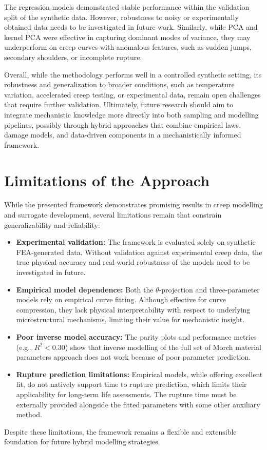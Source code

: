 \documentclass[class=scrbook, crop=false]{standalone}
\begin{document}
The regression models demonstrated stable performance within the validation split of the synthetic data. However, robustness to noisy or experimentally obtained data needs to be investigated in future work. Similarly, while PCA and kernel PCA were effective in capturing dominant modes of variance, they may underperform on creep curves with anomalous features, such as sudden jumps, secondary shoulders, or incomplete rupture.

Overall, while the methodology performs well in a controlled synthetic setting, its robustness and generalization to broader conditions, such as temperature variation, accelerated creep testing, or experimental data, remain open challenges that require further validation. Ultimately, future research should aim to integrate mechanistic knowledge more directly into both sampling and modelling pipelines, possibly through hybrid approaches that combine empirical laws, damage models, and data-driven components in a mechanistically informed framework.

\section{Limitations of the Approach}
\label{Section::Discussion_Limitations}

While the presented framework demonstrates promising results in creep modelling and surrogate development, several limitations remain that constrain generalizability and reliability:

\begin{itemize}
	\item \textbf{Experimental validation:} The framework is evaluated solely on synthetic FEA-generated data. Without validation against experimental creep data, the true physical accuracy and real-world robustness of the models need to be investigated in future.
	
	\item \textbf{Empirical model dependence:} Both the $\theta$-projection and three-parameter models rely on empirical curve fitting. Although effective for curve compression, they lack physical interpretability with respect to underlying microstructural mechanisms, limiting their value for mechanistic insight.
		
	\item \textbf{Poor inverse model accuracy:} The parity plots and performance metrics (e.g., $R^2 < 0.30$) show that inverse modelling of the full set of Morch material parameters approach does not work because of poor parameter prediction.
	
	\item \textbf{Rupture prediction limitations:} Empirical models, while offering excellent fit, do not natively support time to rupture prediction, which limits their applicability for long-term life assessments. The rupture time must be externally provided alongside the fitted parameters with some other auxiliary method.
	
\end{itemize}
Despite these limitations, the framework remains a flexible and extensible foundation for future hybrid modelling strategies.
\end{document}

